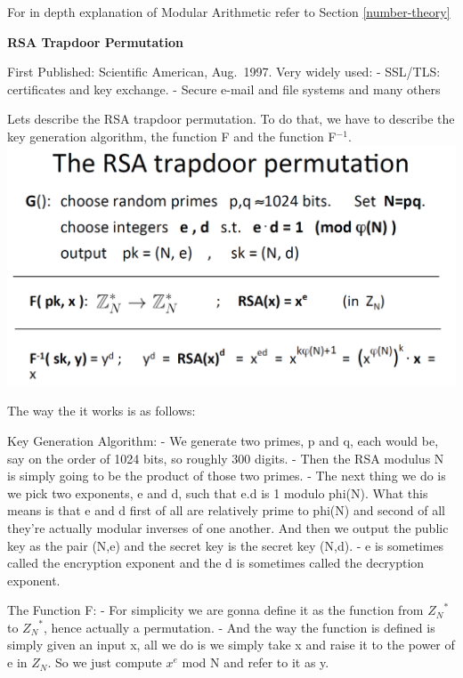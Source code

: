 \documentclass[11pt]{article}
\makeatletter
\def\maxwidth{\ifdim\Gin@nat@width>\linewidth\linewidth
    \else\Gin@nat@width\fi}
\let\Oldincludegraphics\includegraphics
\renewcommand{\includegraphics}[1]{\Oldincludegraphics[width=.8\maxwidth]{#1}}
\makeatother
\begin{document}
For in depth explanation of Modular Arithmetic refer to
Section \ref{number-theory}

\textbf{RSA Trapdoor Permutation}

First Published: Scientific American, Aug.~1997. Very widely used: -
SSL/TLS: certificates and key exchange. - Secure e-mail and file systems
and many others

Lets describe the RSA trapdoor permutation. To do that, we have to
describe the key generation algorithm, the function F and the function
F\(^{-1}\). \includegraphics{./Images/RSA-TDP.png}

The way the it works is as follows:

Key Generation Algorithm: - We generate two primes, p and q, each would
be, say on the order of 1024 bits, so roughly 300 digits. - Then the RSA
modulus N is simply going to be the product of those two primes. - The
next thing we do is we pick two exponents, e and d, such that e.d is 1
modulo phi(N). What this means is that e and d first of all are
relatively prime to phi(N) and second of all they're actually modular
inverses of one another. And then we output the public key as the pair
(N,e) and the secret key is the secret key (N,d). - e is sometimes
called the encryption exponent and the d is sometimes called the
decryption exponent.

The Function F: - For simplicity we are gonna define it as the function
from \({Z_{N}}^{*}\) to \({Z_{N}}^{*}\), hence actually a permutation. -
And the way the function is defined is simply given an input x, all we
do is we simply take x and raise it to the power of e in \(Z_{N}\). So
we just compute \(x^{e}\) mod N and refer to it as y.
\end{document}
